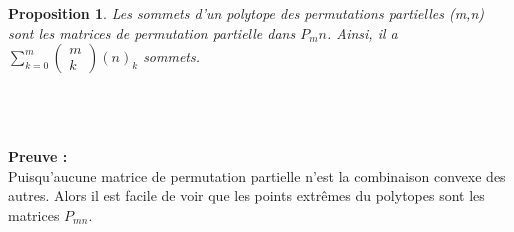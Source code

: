 \documentclass{book}
\newtheorem{petit_nom1}{Proposition}
\begin{document}
 
  \begin{petit_nom1} 
  Les sommets d'un polytope des permutations partielles (m,n) sont les matrices de permutation partielle dans $P_mn$. Ainsi, il a $\sum_{k=0}^{m}{
\begin{pmatrix}
 m\\k
 \end{pmatrix}
 (n)_k
}$ sommets.\\
  \end{petit_nom1} \\\\\\
\textbf{Preuve :}\\
Puisqu'aucune matrice de permutation partielle n'est la combinaison convexe des autres. Alors il est facile de voir que les points extrêmes du polytopes sont les matrices $P_{mn}$.\\
\end{document}
